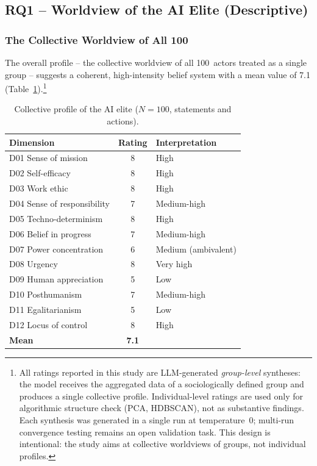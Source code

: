 \documentclass[12pt,a4paper]{article}
\begin{document}
\subsection{RQ1 -- Worldview of the AI Elite (Descriptive)}
\label{sec:ergebnisse:f1}

\subsubsection{The Collective Worldview of All 100}

The overall profile -- the collective worldview of all 100~actors treated as a single group -- suggests a coherent, high-intensity belief system with a mean value of 7.1 (Table~\ref{tab:kollektiv}).\footnote{All ratings reported in this study are LLM-generated \emph{group-level} syntheses: the model receives the aggregated data of a sociologically defined group and produces a single collective profile. Individual-level ratings are used only for algorithmic structure check (PCA, HDBSCAN), not as substantive findings. Each synthesis was generated in a single run at temperature~0; multi-run convergence testing remains an open validation task. This design is intentional: the study aims at collective worldviews of groups, not individual profiles.}

\begin{table}[htbp]
  \centering
  \caption{Collective profile of the AI elite ($N=100$, statements and actions).}
  \label{tab:kollektiv}
  \begin{tabular}{l c l}
    \toprule
    \textbf{Dimension} & \textbf{Rating} & \textbf{Interpretation} \\
    \midrule
    D01 Sense of mission      & 8 & High \\
    D02 Self-efficacy         & 8 & High \\
    D03 Work ethic            & 8 & High \\
    D04 Sense of responsibility & 7 & Medium-high \\
    D05 Techno-determinism    & 8 & High \\
    D06 Belief in progress    & 7 & Medium-high \\
    D07 Power concentration   & 6 & Medium (ambivalent) \\
    D08 Urgency               & 8 & Very high \\
    D09 Human appreciation    & 5 & Low \\
    D10 Posthumanism          & 7 & Medium-high \\
    D11 Egalitarianism        & 5 & Low \\
    D12 Locus of control      & 8 & High \\
    \midrule
    \textbf{Mean}             & \textbf{7.1} & \\
    \bottomrule
  \end{tabular}
\end{table}
\end{document}
